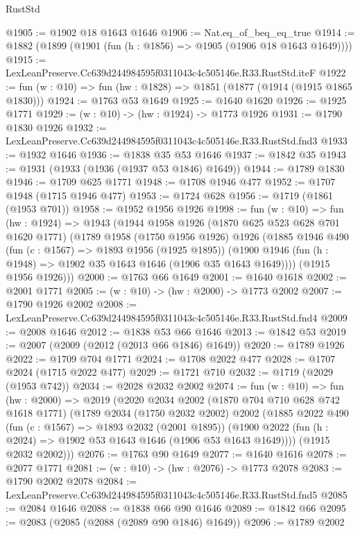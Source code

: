\begin{lexlean}{RustStd}
\begin{coremodule}
@1905 := @1902 @18 @1643 @1646
@1906 := Nat.eq_of_beq_eq_true
@1914 := @1882 (@1899 (@1901 (fun (h : @1856) => @1905 (@1906 @18 @1643 @1649))))
@1915 := LexLeanPreserve.Cc639d244984595f0311043c4c505146e.R33.RustStd.iteF
@1922 := fun (w : @10) => fun (hw : @1828) => @1851 (@1877 (@1914 (@1915 @1865 @1830)))
@1924 := @1763 @53 @1649
@1925 := @1640 @1620
@1926 := @1925 @1771
@1929 := (w : @10) -> (hw : @1924) -> @1773 @1926
@1931 := @1790 @1830 @1926
@1932 := LexLeanPreserve.Cc639d244984595f0311043c4c505146e.R33.RustStd.fnd3
@1933 := @1932 @1646
@1936 := @1838 @35 @53 @1646
@1937 := @1842 @35
@1943 := @1931 (@1933 (@1936 (@1937 @53 @1846) @1649))
@1944 := @1789 @1830
@1946 := @1709 @625 @1771
@1948 := @1708 @1946 @477
@1952 := @1707 @1948 (@1715 @1946 @477)
@1953 := @1724 @628
@1956 := @1719 (@1861 (@1953 @701))
@1958 := @1952 @1956 @1926
@1998 := fun (w : @10) =>
  fun (hw : @1924) =>
  @1943
    (@1944
      @1958
      @1926
      (@1870 @625 @523 @628 @701 @1620 @1771)
      (@1789
        @1958
        (@1750 @1956 @1926)
        @1926
        (@1885
          @1946
          @490
          (fun (c : @1567) => @1893 @1956 (@1925 @1895))
          (@1900 @1946 (fun (h : @1948) => @1902 @35 @1643 @1646 (@1906 @35 @1643 @1649))))
        (@1915 @1956 @1926)))
@2000 := @1763 @66 @1649
@2001 := @1640 @1618
@2002 := @2001 @1771
@2005 := (w : @10) -> (hw : @2000) -> @1773 @2002
@2007 := @1790 @1926 @2002
@2008 := LexLeanPreserve.Cc639d244984595f0311043c4c505146e.R33.RustStd.fnd4
@2009 := @2008 @1646
@2012 := @1838 @53 @66 @1646
@2013 := @1842 @53
@2019 := @2007 (@2009 (@2012 (@2013 @66 @1846) @1649))
@2020 := @1789 @1926
@2022 := @1709 @704 @1771
@2024 := @1708 @2022 @477
@2028 := @1707 @2024 (@1715 @2022 @477)
@2029 := @1721 @710
@2032 := @1719 (@2029 (@1953 @742))
@2034 := @2028 @2032 @2002
@2074 := fun (w : @10) =>
  fun (hw : @2000) =>
  @2019
    (@2020
      @2034
      @2002
      (@1870 @704 @710 @628 @742 @1618 @1771)
      (@1789
        @2034
        (@1750 @2032 @2002)
        @2002
        (@1885
          @2022
          @490
          (fun (c : @1567) => @1893 @2032 (@2001 @1895))
          (@1900 @2022 (fun (h : @2024) => @1902 @53 @1643 @1646 (@1906 @53 @1643 @1649))))
        (@1915 @2032 @2002)))
@2076 := @1763 @90 @1649
@2077 := @1640 @1616
@2078 := @2077 @1771
@2081 := (w : @10) -> (hw : @2076) -> @1773 @2078
@2083 := @1790 @2002 @2078
@2084 := LexLeanPreserve.Cc639d244984595f0311043c4c505146e.R33.RustStd.fnd5
@2085 := @2084 @1646
@2088 := @1838 @66 @90 @1646
@2089 := @1842 @66
@2095 := @2083 (@2085 (@2088 (@2089 @90 @1846) @1649))
@2096 := @1789 @2002

\end{coremodule}
\end{lexlean}
